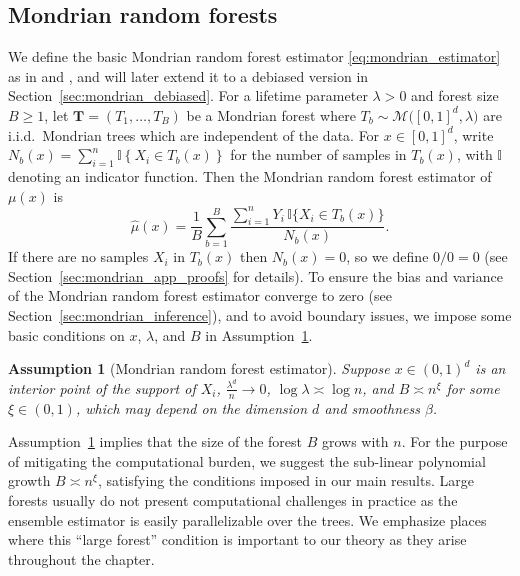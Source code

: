 \documentclass[11pt,lof]{puthesis}
\newcommand{\I}{\ensuremath{\mathbb{I}}}
\newcommand{\bT}{\ensuremath{\mathbf{T}}}
\newcommand{\cM}{\ensuremath{\mathcal{M}}}
\theoremstyle{break}
\newtheorem{assumption}{Assumption}[section]
\theoremstyle{proof}
\begin{document}
\subsection{Mondrian random forests}
\label{sec:mondrian_forests}

We define the basic Mondrian random forest estimator
\eqref{eq:mondrian_estimator} as in \citet{lakshminarayanan2014mondrian} and
\citet{mourtada2020minimax}, and will later extend it to a debiased version in
Section~\ref{sec:mondrian_debiased}. For a lifetime parameter $\lambda > 0$ and
forest
size $B \geq 1$, let $\bT = (T_1, \ldots, T_B)$ be a Mondrian forest where
$T_b \sim \cM\big([0,1]^d, \lambda\big)$ are i.i.d.\ Mondrian trees
which are independent of the data. For $x \in [0,1]^d$, write
$N_b(x) = \sum_{i=1}^{n} \I \left\{ X_i \in T_b(x) \right\}$ for the number of
samples in $T_b(x)$, with $\I$ denoting an indicator function. Then the
Mondrian random forest estimator of $\mu(x)$ is
%
\begin{equation}
\label{eq:mondrian_estimator}
\hat\mu(x) = \frac{1}{B} \sum_{b=1}^B
\frac{\sum_{i=1}^n Y_i \, \I\big\{ X_i \in T_b(x) \big\}} {N_b(x)}.
\end{equation}
%
If there are no samples $X_i$ in $T_b(x)$ then $N_b(x) = 0$, so we define
$0/0 = 0$ (see Section~\ref{sec:mondrian_app_proofs} for details). To ensure the
bias and variance of the Mondrian random forest estimator converge to zero (see
Section~\ref{sec:mondrian_inference}), and to avoid boundary issues, we impose
some basic conditions on $x$, $\lambda$, and $B$ in
Assumption~\ref{ass:mondrian_estimator}.

\begin{assumption}[Mondrian random forest estimator]%
\label{ass:mondrian_estimator}
%
Suppose $x \in (0,1)^d$ is an interior point of the support of $X_i$,
$\frac{\lambda^d}{n} \to 0$,
$\log \lambda \asymp \log n$,
and $B \asymp n^{\xi}$ for some $\xi \in (0, 1)$,
which may depend on the dimension $d$ and smoothness $\beta$.
%
\end{assumption}

Assumption~\ref{ass:mondrian_estimator} implies that the size of the forest $B$
grows
with $n$. For the purpose of mitigating the computational burden, we suggest
the sub-linear polynomial growth $B \asymp n^{\xi}$, satisfying the conditions
imposed in our main results. Large forests usually do not present computational
challenges in practice as the ensemble estimator is easily parallelizable over
the trees. We emphasize places where this ``large forest'' condition is
important to our theory as they arise throughout the chapter.
\end{document}
